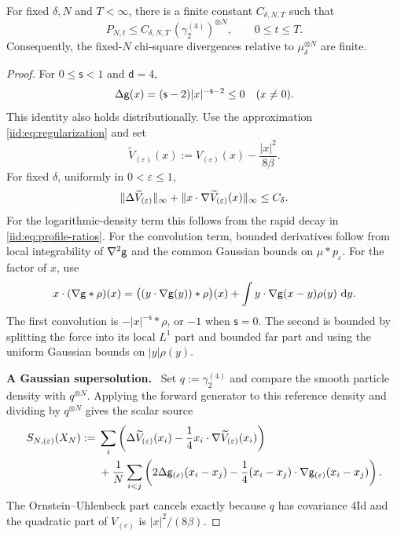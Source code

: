 \documentclass[11pt,reqno]{amsart}
\numberwithin{equation}{section}
\theoremstyle{plain}
\theoremstyle{remark}
\DeclarePairedDelimiter{\norm}{\lVert}{\rVert}
\renewcommand{\d}{\mathsf{d}}\newcommand{\s}{\mathsf{s}}
\newcommand{\parheading}[1]{\par\medskip\noindent\textbf{#1}\ }
\newcommand{\Id}{\mathrm{Id}}
\begin{document}
\begin{lemma}\label{iid:lem:fixed-N-finite}
For fixed $\delta,N$ and $T<\infty$, there is a finite constant $C_{\delta,N,T}$ such that
\begin{equation}\label{iid:eq:Gaussian-domination}
 P_{N,t}\le C_{\delta,N,T}\,(\gamma_2^{(4)})^{\otimes N},\qquad 0\le t\le T.
\end{equation}
Consequently, the fixed-$N$ chi-square divergences relative to $\mu_\delta^{\otimes N}$ are finite.
\end{lemma}
\begin{proof}
For $0\le \s<1$ and $\d=4$,
\begin{equation}\label{iid:eq:superharmonic}
 \Delta\g(x)=(\s-2)|x|^{-\s-2}\le0\quad(x\ne0).
\end{equation}
This identity also holds distributionally. Use the approximation \eqref{iid:eq:regularization} and set
\begin{equation}\label{iid:eq:mollified-confinement-remainder}
 \widetilde V_{(\varepsilon)}(x):=V_{(\varepsilon)}(x)-\frac{|x|^2}{8\beta}.
\end{equation} For fixed $\delta$, uniformly in $0<\varepsilon\le1$,
\begin{equation}\label{iid:eq:remainder-tail-bound}
 \norm{\Delta\widetilde V_{(\varepsilon)}}_\infty+
 \norm{x\cdot \nabla\widetilde V_{(\varepsilon)}(x)}_\infty\le C_\delta.
\end{equation}
For the logarithmic-density term this follows from the rapid decay in \eqref{iid:eq:profile-ratios}. For the convolution term, bounded derivatives follow from local integrability of $\nabla^2\mathsf g$ and the common Gaussian bounds on $\mu*p_\varepsilon$. For the factor of $x$, use
\begin{equation}\label{iid:eq:virial-convolution}
 x\cdot(\nabla\mathsf g*\rho)(x)
 =\bigl((y\cdot\nabla\mathsf g(y))*\rho\bigr)(x)
 +\int y\cdot\nabla\mathsf g(x-y)\rho(y)\,\,\mathrm d y.
\end{equation}
The first convolution is $-|x|^{-\s}*\rho$, or $-1$ when $\s=0$. The second is bounded by splitting the force into its local $L^1$ part and bounded far part and using the uniform Gaussian bounds on $|y|\rho(y)$.

\parheading{A Gaussian supersolution.}
Set $q:=\gamma_2^{(4)}$ and compare the smooth particle density with $q^{\otimes N}$. Applying the forward generator to this reference density and dividing by $q^{\otimes N}$ gives the scalar source
\begin{align}\label{iid:eq:Gaussian-source}
 S_{N,(\varepsilon)}(X_N):={}&\sum_i\left(\Delta\widetilde V_{(\varepsilon)}(x_i)
 -\frac14x_i\cdot \nabla\widetilde V_{(\varepsilon)}(x_i)\right)\notag\\
 &+\frac1N\sum_{i<j}\left(2\Delta\mathsf g_{(\varepsilon)}(x_i-x_j)
 -\frac14(x_i-x_j)\cdot\nabla\mathsf g_{(\varepsilon)}(x_i-x_j)\right).
\end{align}
The Ornstein--Uhlenbeck part cancels exactly because $q$ has covariance $4\Id$ and the quadratic part of $V_{(\varepsilon)}$ is $|x|^2/(8\beta)$.


\end{proof}
\end{document}
